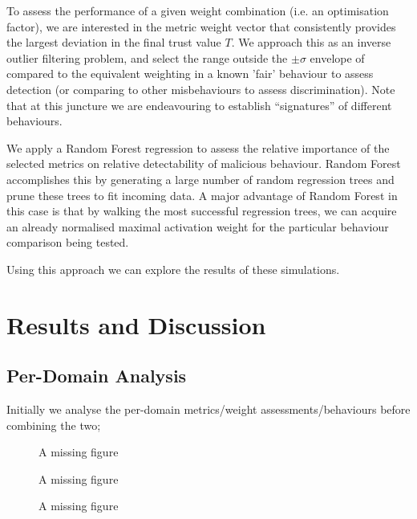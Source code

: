 To assess the performance of a given weight combination (i.e. an optimisation factor), we are interested in the metric weight vector that consistently provides the largest deviation in the final trust value $T$. We approach this as an inverse outlier filtering problem, and select the range outside the $\pm\sigma$ envelope of compared to the equivalent weighting in a known 'fair' behaviour to assess detection (or comparing to other misbehaviours to assess discrimination). Note that at this juncture we are endeavouring to establish ``signatures'' of different behaviours.

We apply a Random Forest regression \cite{Breiman2001} to assess the relative importance of the selected metrics on relative detectability of malicious behaviour. 
Random Forest accomplishes this by generating a large number of random regression trees and prune these trees to fit incoming data. A major advantage of Random Forest in this case is that by walking the most successful regression trees, we can acquire an already normalised maximal activation weight for the particular behaviour comparison being tested.

Using this approach we can explore the results of these simulations.

\section{Results and Discussion}

\subsection{Per-Domain Analysis}

Initially we analyse the per-domain metrics/weight assessments/behaviours before combining the two; 

\begin{figure}[h]
	\centering
	\caption{A missing figure}
	\label{fig:comms_feature_extraction}
\end{figure}

\begin{figure}[h]
	\centering
	\caption{A missing figure}
	\label{fig:comms_trust_signature}
\end{figure}

\begin{figure}[h]
	\centering
	\caption{A missing figure}
	\label{fig:comms_feature_extraction}
\end{figure}

